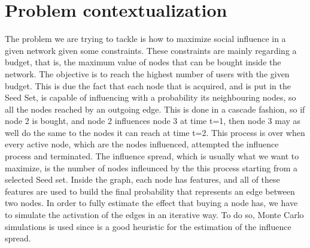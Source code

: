\newpage
\section{Problem contextualization}

The problem we are trying to tackle is how to maximize social influence in a given network given some constraints.
These constraints are mainly regarding a budget, that is, the maximum value of nodes that can be bought inside the network.
The objective is to reach the highest number of users with the given budget.
This is due the fact that each node that is acquired, and is put in the Seed Set, is capable of influencing with a probability its neighbouring nodes, so all the nodes reached by an outgoing edge.
This is done in a cascade fashion, so if node 2 is bought, and node 2 influences node 3 at time t=1, then node 3 may as well do the same to the nodes it can reach at time t=2.
This process is over when every active node, which are the nodes influenced, attempted the influence process and terminated.
The influence spread, which is usually what we want to maximize, is the number of nodes infleunced by the this process starting from a selected Seed set.
Inside the graph, each node has features, and all of these features are used to build the final probability that represents an edge between two nodes.
In order to fully estimate the effect that buying a node has, we have to simulate the activation of the edges in an iterative way.
To do so, Monte Carlo simulations is used since is a good heuristic for the estimation of the influence spread.

